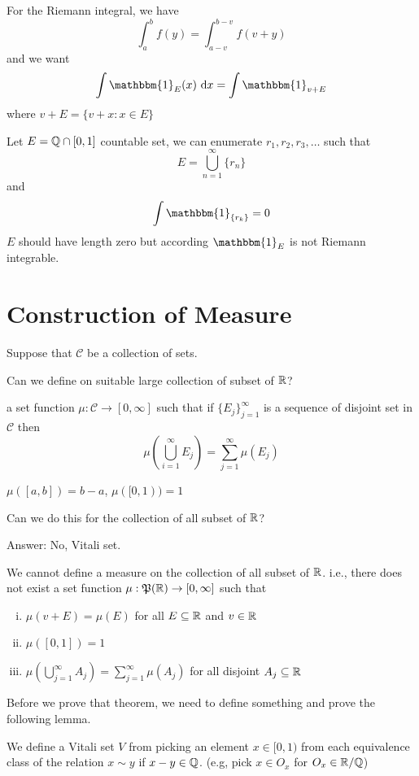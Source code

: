 \begin{example}
  For the Riemann integral, we have
  \[\int_a^b f(y) = \int_{a-v}^{b-v} f(v+y)\]
  and we want
  \[\int \mathbbm{1}_E(x)\ \mathrm{d}x = \int \mathbbm{1}_{v+E}\]
  where $v+E = \{v+x: x\in E\}$
\end{example}

Let $E = \mathbb Q \cap [0, 1]$ countable set, we can enumerate
$r_1, r_2, r_3, \dotsc$ such that 
\[E = \bigcup_{n=1}^{\infty}\{r_n\}\] and 
\[\int \mathbbm{1}_{\{r_k\}} = 0\]
$E$ should have length zero but according $\mathbbm{1}_E$ is not 
Riemann integrable.

\section{Construction of Measure}

Suppose that $\mathcal{C}$ be a collection of sets.

Can we define on suitable large collection of subset of $\mathbb R$?

a set function $\mu: \mathcal{C} \to [0, \infty]$ such that
if $\{E_j\}_{j=1}^\infty$ is a sequence of disjoint set in $\mathcal{C}$ then
\[\mu\left(\bigcup_{i=1}^\infty E_j\right) = \sum_{j=1}^\infty \mu(E_j)\]

$\mu([a, b]) = b-a$, $\mu([0, 1)) = 1$

Can we do this for the collection of all subset of $\mathbb R$?

Answer: No, Vitali set.

\begin{theorem}
  We cannot define a measure on the collection of all subset of $\mathbb R$. i.e.,
  there does not exist a set function $\mu: \mathfrak P(\mathbb R) \to [0, \infty]$ such that
  \begin{enumerate}[(i)]
    \item $\mu(v + E) = \mu(E)$ for all $E \subseteq \mathbb R$ and $v \in \mathbb R$
    \item $\mu([0, 1]) = 1$
    \item $\mu\left(\bigcup_{j=1}^\infty A_j\right) = \sum_{j=1}^\infty \mu(A_j)$ for all disjoint $A_j \subseteq \mathbb R$
  \end{enumerate}
\end{theorem}

Before we prove that theorem, we need to define something and prove the following lemma.

\begin{definition}
  We define a Vitali set $V$ from picking an element $x \in [0, 1)$ from each equivalence class of the relation $x \sim y$ if $x - y \in \mathbb Q$.
  (e.g, pick $x \in O_x$ for $O_x \in \mathbb R/\mathbb Q$)
\end{definition}

